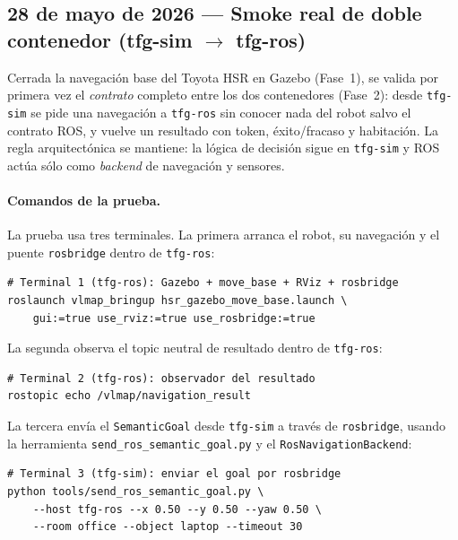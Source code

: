 \documentclass[11pt,a4paper]{article}
\begin{document}
\subsection*{28 de mayo de 2026 --- Smoke real de doble contenedor (tfg-sim $\rightarrow$ tfg-ros)}

Cerrada la navegación base del Toyota HSR en Gazebo (Fase~1), se valida por
primera vez el \emph{contrato} completo entre los dos contenedores (Fase~2):
desde \texttt{tfg-sim} se pide una navegación a \texttt{tfg-ros} sin conocer
nada del robot salvo el contrato ROS, y vuelve un resultado con token,
éxito/fracaso y habitación. La regla arquitectónica se mantiene: la lógica de
decisión sigue en \texttt{tfg-sim} y ROS actúa sólo como \emph{backend} de
navegación y sensores.

\paragraph{Comandos de la prueba.} La prueba usa tres terminales. La primera
arranca el robot, su navegación y el puente \texttt{rosbridge} dentro de
\texttt{tfg-ros}:

\begin{verbatim}
# Terminal 1 (tfg-ros): Gazebo + move_base + RViz + rosbridge
roslaunch vlmap_bringup hsr_gazebo_move_base.launch \
    gui:=true use_rviz:=true use_rosbridge:=true
\end{verbatim}

La segunda observa el topic neutral de resultado dentro de \texttt{tfg-ros}:

\begin{verbatim}
# Terminal 2 (tfg-ros): observador del resultado
rostopic echo /vlmap/navigation_result
\end{verbatim}

La tercera envía el \texttt{SemanticGoal} desde \texttt{tfg-sim} a través de
\texttt{rosbridge}, usando la herramienta \texttt{send\_ros\_semantic\_goal.py}
y el \texttt{RosNavigationBackend}:

\begin{verbatim}
# Terminal 3 (tfg-sim): enviar el goal por rosbridge
python tools/send_ros_semantic_goal.py \
    --host tfg-ros --x 0.50 --y 0.50 --yaw 0.50 \
    --room office --object laptop --timeout 30
\end{verbatim}
\end{document}
